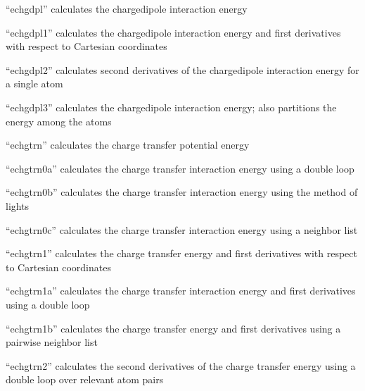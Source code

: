 \documentclass[letterpaper,11pt,english]{sphinxmanual}
\begin{document}

“echgdpl” calculates the charge\sphinxhyphen{}dipole interaction energy


“echgdpl1” calculates the charge\sphinxhyphen{}dipole interaction energy
and first derivatives with respect to Cartesian coordinates


“echgdpl2” calculates second derivatives of the
charge\sphinxhyphen{}dipole interaction energy for a single atom


“echgdpl3” calculates the charge\sphinxhyphen{}dipole interaction energy;
also partitions the energy among the atoms


“echgtrn” calculates the charge transfer potential energy


“echgtrn0a” calculates the charge transfer interaction energy
using a double loop


“echgtrn0b” calculates the charge transfer interaction energy
using the method of lights


“echgtrn0c” calculates the charge transfer interaction energy
using a neighbor list


“echgtrn1” calculates the charge transfer energy and first
derivatives with respect to Cartesian coordinates


“echgtrn1a” calculates the charge transfer interaction energy
and first derivatives using a double loop


“echgtrn1b” calculates the charge transfer energy and first
derivatives using a pairwise neighbor list


“echgtrn2” calculates the second derivatives of the charge
transfer energy using a double loop over relevant atom pairs
\end{document}
